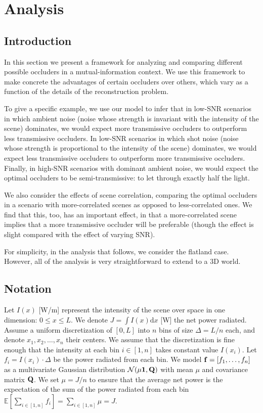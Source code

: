 \documentclass{article}
\begin{document}
\section{Analysis}

\subsection{Introduction}

In this section we present a framework for analyzing and comparing different possible occluders in a mutual-information context. We use this framework to make concrete the advantages of certain occluders over others, which vary as a function of the details of the reconstruction problem. 

To give a specific example, we use our model to infer that in low-SNR scenarios in which ambient noise (noise whose strength is invariant with the intensity of the scene) dominates, we would expect more transmissive occluders to outperform less transmissive occluders. In low-SNR scenarios in which shot noise (noise whose strength is proportional to the intensity of the scene) dominates, we would expect less transmissive occluders to outperform more transmissive occluders. Finally, in high-SNR scenarios with dominant ambient noise, we would expect the optimal occluders to be  semi-transmissive: to let through exactly half the light.

We also consider the effects of scene correlation, comparing the optimal occluders in a scenario with more-correlated scenes as opposed to less-correlated ones. We find that this, too, has an important effect, in that a more-correlated scene implies that a more transmissive occluder will be preferable (though the effect is slight compared with the effect of varying SNR). 

For simplicity, in the analysis that follows, we consider the flatland case. However, all of the analysis is very straightforward to extend to a 3D world.

\subsection{Notation}


Let $I(x)$ [W/m] represent the intensity of the scene over space in one dimension: $0\leq x\leq L$. We denote $J=\int I(x)\mathrm{d}x$ [W] the net power radiated. Assume a uniform discretization of $[0,L]$ into $n$ bins of size $\Delta=L/n$ each, and denote $x_1,x_2,\ldots,x_n$ their centers. We assume that the discretization is fine enough that the intensity at each bin $i\in[1,n]$ takes constant value $I(x_i)$. Let $f_i=I(x_i)\cdot \Delta$ be the power radiated from each bin.
We model $\mathbf{f}=[f_1,\ldots,f_n]$ as a multivariate Gaussian distribution $\mathcal{N}({\mu}\mathbf{1},\mathbf{Q})$ with mean $\mu$ and covariance matrix $\mathbf{Q}$. We set $\mu=J/n$ to ensure that the average net power is the expectation of the sum of the power radiated from each bin $\mathbb{E}[\sum_{i\in[1,n]}f_i]=\sum_{i\in[1,n]}\mu=J$.
\end{document}
